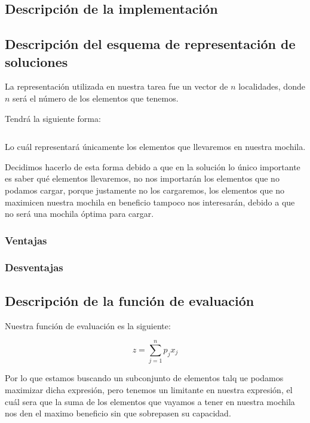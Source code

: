 \documentclass{article}
\begin{document}
\subsection*{Descripción de la implementación}

\subsection*{Descripción del esquema de representación de soluciones}
La representación utilizada en nuestra tarea fue un vector de $n$ localidades, donde $n$ será el número de los elementos que tenemos.

Tendrá la siguiente forma:

\begin{equation*}
[x_1, x_2, x_3, \dots x_n]
\end{equation*}

Lo cuál representará únicamente los elementos que llevaremos en nuestra mochila.

Decidimos hacerlo de esta forma debido a que en la solución lo único importante es saber qué elementos llevaremos, no nos importarán los elementos que no podamos cargar, porque justamente no los cargaremos, los elementos que no maximicen nuestra mochila en beneficio tampoco nos interesarán, debido a que no será una mochila óptima para cargar.

\subsubsection*{Ventajas}

\subsubsection*{Desventajas}

\subsection*{Descripción de la función de evaluación}
Nuestra función de evaluación es la siguiente:

\begin{equation*}
z = \sum_{j=1}^n p_jx_j
\end{equation*}

Por lo que estamos buscando un subconjunto de elementos talq ue podamos maximizar dicha expresión, pero tenemos un limitante en nuestra expresión, el cuál sera que la suma de los elementos que vayamos a tener en nuestra mochila nos den el maximo beneficio sin que sobrepasen su capacidad.
\end{document}
